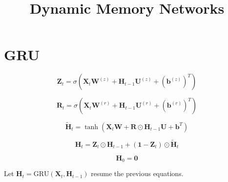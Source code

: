 \documentclass[french]{article}
\title{Dynamic Memory Networks}
\author{}
\date{}
\renewcommand{\vec}[1]{\boldsymbol{#1}}
\newcommand{\gru}{\text{GRU}}
\begin{document}
\maketitle

\section{GRU}

\begin{equation}
  \vec{Z}_t = \sigma\left(\vec{X}_t\vec{W}^{(z)} + \vec{H}_{t-1}\vec{U}^{(z)} + (\vec{b}^{(z)})^T\right)
\end{equation}

\begin{equation}
  \vec{R}_t = \sigma\left(\vec{X}_t\vec{W}^{(r)} + \vec{H}_{t-1}\vec{U}^{(r)} + (\vec{b}^{(r)})^T\right)
\end{equation}

\begin{equation}
  \tilde{\vec{H}}_t = \tanh\left(\vec{X}_t\vec{W} + \vec{R} \odot \vec{H}_{t-1}\vec{U} + \vec{b}^T\right)
\end{equation}

\begin{equation}
  \vec{H}_t = \vec{Z}_t \odot \vec{H}_{t-1} + \left(\vec{1} - \vec{Z}_t\right) \odot \tilde{\vec{H}}_t
\end{equation}

\begin{equation}
  \vec{H}_0 = \vec{0}
\end{equation}

Let $\vec{H}_t = \gru(\vec{X}_t, \vec{H}_{t-1})$ resume the previous equations.
\end{document}
